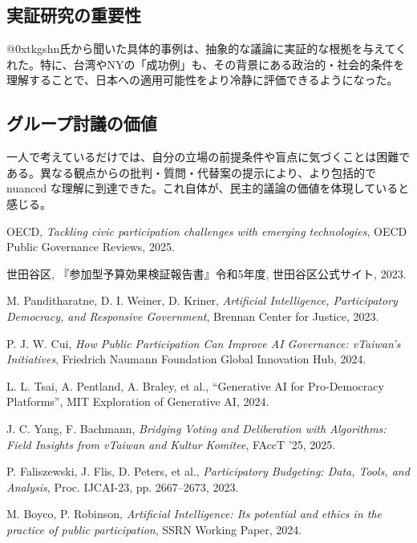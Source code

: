 \documentclass[12pt,a4j]{jarticle}
\begin{document}
\subsection{実証研究の重要性}
@0xtkgshn氏から聞いた具体的事例は、抽象的な議論に実証的な根拠を与えてくれた。特に、台湾やNYの「成功例」も、その背景にある政治的・社会的条件を理解することで、日本への適用可能性をより冷静に評価できるようになった。

\subsection{グループ討議の価値}
一人で考えているだけでは、自分の立場の前提条件や盲点に気づくことは困難である。異なる観点からの批判・質問・代替案の提示により、より包括的で nuanced な理解に到達できた。これ自体が、民主的議論の価値を体現していると感じる。

\begin{thebibliography}{99}

 OECD, \textit{Tackling civic participation challenges with emerging technologies}, OECD Public Governance Reviews, 2025.

 世田谷区, 『参加型予算効果検証報告書』令和5年度, 世田谷区公式サイト, 2023.

 M. Panditharatne, D. I. Weiner, D. Kriner, \textit{Artificial Intelligence, Participatory Democracy, and Responsive Government}, Brennan Center for Justice, 2023.

 P. J. W. Cui, \textit{How Public Participation Can Improve AI Governance: vTaiwan's Initiatives}, Friedrich Naumann Foundation Global Innovation Hub, 2024.

 L. L. Tsai, A. Pentland, A. Braley, et al., ``Generative AI for Pro-Democracy Platforms'', MIT Exploration of Generative AI, 2024.

 J. C. Yang, F. Bachmann, \textit{Bridging Voting and Deliberation with Algorithms: Field Insights from vTaiwan and Kultur Komitee}, FAccT '25, 2025.

 P. Faliszewski, J. Flis, D. Peters, et al., \textit{Participatory Budgeting: Data, Tools, and Analysis}, Proc. IJCAI-23, pp. 2667–2673, 2023.

 M. Boyco, P. Robinson, \textit{Artificial Intelligence: Its potential and ethics in the practice of public participation}, SSRN Working Paper, 2024.

\end{thebibliography}
\end{document}
